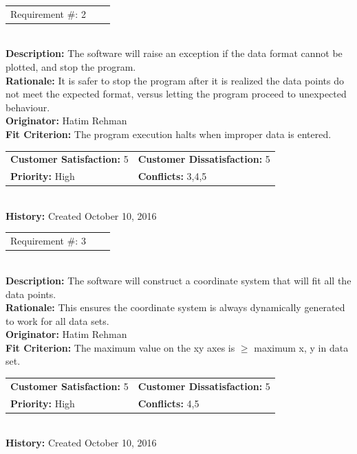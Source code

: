 \documentclass[12pt, titlepage]{article}
\begin{document}
\begin{reqbox}
\begin{tabular}{ccc}Requirement \#: 2
\end{tabular} \\
\textbf{Description:} The software will raise an exception if the data format cannot be plotted, and stop the program. \\
\textbf{Rationale:} It is safer to stop the program after it is realized the data points do not meet the expected format, versus letting the program proceed to unexpected behaviour. \\
\textbf{Originator:} Hatim Rehman \\
\textbf{Fit Criterion:} The program execution halts when improper data is entered.\\
\begin{tabular}{ll}
\textbf{Customer Satisfaction:} 5 & \textbf{Customer Dissatisfaction:} 5 \\
\textbf{Priority:} High & \textbf{Conflicts:} 3,4,5\\
\end{tabular} \\
\textbf{History:} Created October 10, 2016
\end{reqbox}

\begin{reqbox}
\begin{tabular}{ccc}Requirement \#: 3
\end{tabular} \\
\textbf{Description:} The software will construct a coordinate system that will fit all the data points.\\
\textbf{Rationale:} This ensures the coordinate system is always dynamically generated to work for all data sets. \\
\textbf{Originator:} Hatim Rehman \\
\textbf{Fit Criterion:} The maximum value on the xy axes is $\geq$ maximum x, y in data set.\\
\begin{tabular}{ll}
\textbf{Customer Satisfaction:} 5 & \textbf{Customer Dissatisfaction:} 5 \\
\textbf{Priority:} High & \textbf{Conflicts:} 4,5\\
\end{tabular} \\
\textbf{History:} Created October 10, 2016
\end{reqbox}
\end{document}
